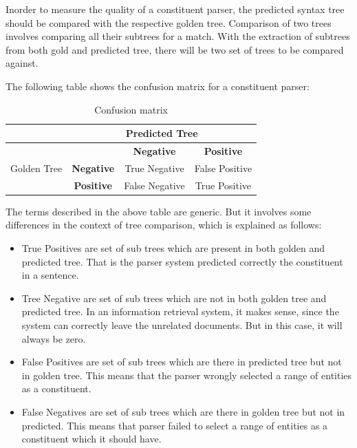 \documentclass[a4paper, 11pt]{article}
\begin{document}
Inorder to measure the quality of a constituent parser, the predicted syntax tree should be compared with the respective golden tree. Comparison of two trees involves comparing all their subtrees for a match. With the extraction of subtrees from both gold and predicted tree, there will be two set of trees to be compared against.

The following table shows the confusion matrix for a constituent parser:

\begin{table}[h!]
  \begin{center}
    \label{tab:table1}
    \begin{tabular}{c|c|c|c}
      &  \multicolumn{3}{c}{Predicted Tree}\\
	  \hline
      \multirow{3}{*}{Golden Tree} & & \textbf{Negative} & \textbf{Positive} \\
      & \textbf{Negative} & True Negative & False Positive \\
      & \textbf{Positive} & False Negative & True Positive\\
    \end{tabular}
    \caption{Confusion matrix}
  \end{center}
\end{table}

The terms described in the above table are generic. But it involves some differences in the context of tree comparison, which is explained as follows:
\begin{itemize}
\item True Positives are set of sub trees which are present in both golden and predicted tree. That is the parser system predicted correctly the constituent in a sentence.
\item Tree Negative are set of sub trees which are not in both golden tree and predicted tree. In an information retrieval system, it makes sense, since the system can correctly leave the unrelated documents. But in this case, it will always be zero.
\item False Positives are set of sub trees which are there in predicted tree but not in golden tree. This means that the parser wrongly selected a range of entities as a constituent. 
\item False Negatives are set of sub trees which are there in golden tree but not in predicted. This means that parser failed to select a range of entities as a constituent which it should have. 
\end{itemize}
\end{document}
